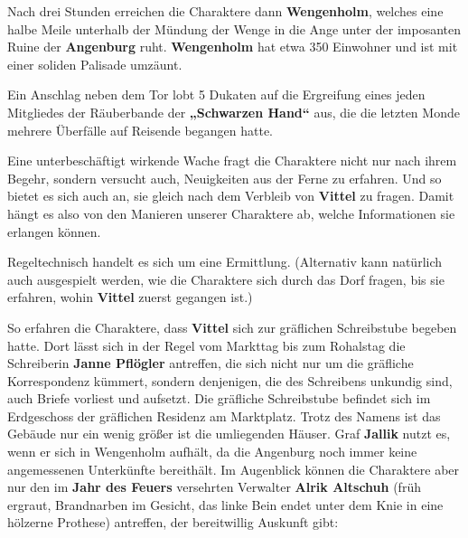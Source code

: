 

Nach drei Stunden erreichen die Charaktere dann \textbf{Wengenholm}, welches eine halbe Meile unterhalb der Mündung der Wenge in die Ange unter der imposanten Ruine der \textbf{Angenburg} ruht.
\textbf{Wengenholm} hat etwa 350 Einwohner und ist mit einer soliden Palisade umzäunt.
	
	Ein Anschlag neben dem Tor lobt 5 Dukaten auf die Ergreifung eines jeden Mitgliedes der Räuberbande der \textbf{„Schwarzen Hand“} aus, die die letzten Monde mehrere Überfälle auf Reisende begangen hatte.
	
	Eine unterbeschäftigt wirkende Wache fragt die Charaktere nicht nur nach ihrem Begehr, sondern versucht auch, Neuigkeiten aus der Ferne zu erfahren.
	Und so bietet es sich auch an, sie gleich nach dem Verbleib von \textbf{Vittel} zu fragen.
	Damit hängt es also von den Manieren unserer Charaktere ab, welche Informationen sie erlangen können. 

Regeltechnisch handelt es sich um eine Ermittlung.
(Alternativ kann natürlich auch ausgespielt werden, wie die Charaktere sich durch das Dorf fragen, bis sie erfahren, wohin \textbf{Vittel} zuerst gegangen ist.)



So erfahren die Charaktere, dass \textbf{Vittel} sich zur gräflichen Schreibstube begeben hatte.
Dort lässt sich in der Regel vom Markttag bis zum Rohalstag die Schreiberin \textbf{Janne Pflögler} antreffen, die sich nicht nur um die gräfliche Korrespondenz kümmert, sondern denjenigen, die des Schreibens unkundig sind, auch Briefe vorliest und aufsetzt.
Die gräfliche Schreibstube befindet sich im Erdgeschoss der gräflichen Residenz am Marktplatz.
Trotz des Namens ist das Gebäude nur ein wenig größer ist die umliegenden Häuser.
Graf \textbf{Jallik} nutzt es, wenn er sich in Wengenholm aufhält, da die Angenburg noch immer keine angemessenen Unterkünfte bereithält.
Im Augenblick können die Charaktere aber nur den im \textbf{Jahr des Feuers} versehrten Verwalter \textbf{Alrik Altschuh} (früh ergraut, Brandnarben im Gesicht, das linke Bein endet unter dem Knie in eine hölzerne Prothese) antreffen, der bereitwillig Auskunft gibt:

